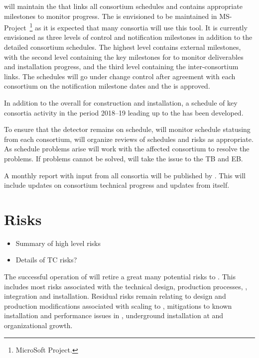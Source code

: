  will maintain the  that links all consortium schedules
and contains appropriate milestones to monitor progress. The 
is envisioned to be maintained in MS-Project~\footnote{MicroSoft\texttrademark{} Project.} as it is expected
that many consortia will use this tool. It is currently envisioned as
three levels of control and notification milestones in addition to the
detailed consortium schedules. The highest level contains external
milestones, with the second level containing the key milestones for 
to monitor deliverables and installation progress, and the third level
containing the inter-consortium links. The schedules will go
under change control after agreement with each consortium on the
notification milestone dates and the  is approved.

In addition to the overall  for construction and
installation, a schedule of key consortia activity in the period
2018--19 leading up to the  has been developed.

To ensure that the  detector remains on schedule,
 will monitor schedule statusing from each consortium, will organize
reviews of schedules and risks as appropriate.  As schedule problems
arise  will work with the affected consortium to resolve the
problems. If problems cannot be solved,  will take the issue to the
TB and EB.

A monthly report with input from all consortia will be published by
. This will include updates on consortium technical progress and
updates from  itself.

\section{Risks}
\label{sec:fdsp-coord-risks}

\begin{itemize}
 \item Summary of high level risks
 \item Details of TC risks?
\end{itemize}


The successful operation of  will retire a great many
potential risks to . This includes most risks associated with the
technical design, production processes, , integration
and installation. Residual risks remain relating to design and
production modifications associated with scaling to , mitigations
to known installation and performance issues in , underground
installation at \surf and organizational growth.

